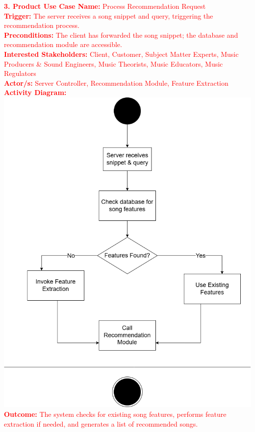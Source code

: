 \documentclass[12pt]{article}
\begin{document}
\noindent\textcolor{red}{\textbf{3. Product Use Case Name:} Process Recommendation Request} \\
\textcolor{red}{\textbf{Trigger:} The server receives a song snippet and query, triggering the recommendation process.} \\
\textcolor{red}{\textbf{Preconditions:} The client has forwarded the song snippet; the database and recommendation module are accessible.} \\
\textcolor{red}{\textbf{Interested Stakeholders:} Client, Customer, Subject Matter Experts, Music Producers \& Sound Engineers, Music Theorists, Music Educators, Music Regulators} \\
\textcolor{red}{\textbf{Actor/s:} Server Controller, Recommendation Module, Feature Extraction} \\
\textcolor{red}{\textbf{Activity Diagram:}} \\
\includegraphics[width=\textwidth]{PUC3.drawio.png}
\textcolor{red}{\textbf{Outcome:} The system checks for existing song features, performs feature extraction if needed, and generates a list of recommended songs.} \\
\end{document}
